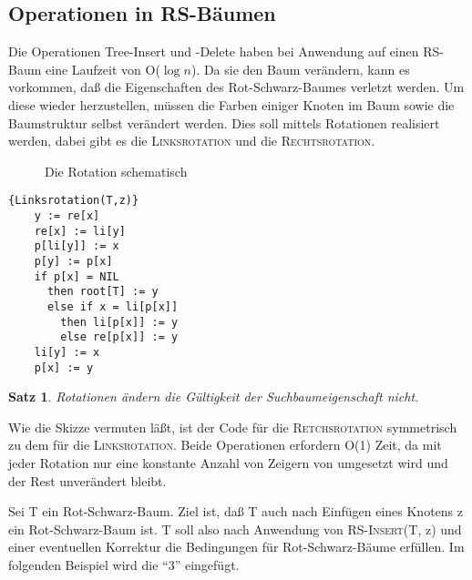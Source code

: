 \documentclass[ngerman,draft,parskip=half*,twoside]{scrreprt}
\theoremstyle{break}
\newtheorem{satz}{Satz}
\begin{document}
\subsection{Operationen in RS-Bäumen}

Die Operationen Tree-Insert und -Delete haben bei Anwendung auf einen RS-Baum eine Laufzeit von O($\log n$). Da
sie den Baum verändern, kann es vorkommen, daß die Eigenschaften des Rot-Schwarz-Baumes verletzt werden. Um diese wieder herzustellen,
müssen die
Farben einiger Knoten im Baum sowie die Baumstruktur selbst verändert werden. Dies soll mittels Rotationen realisiert werden, dabei
gibt es die \textsc{Linksrotation} und die \textsc{Rechtsrotation}.

\centering
\begin{figure}[H]

\caption{Die Rotation schematisch}
\end{figure}


\begin{Algorithmus}[H]
\begin{lstlisting}[frame=tlrb, mathescape=true, title=\textsc{Linksrotation\textnormal{(T, z)}}, gobble=4]{Linksrotation(T,z)}
    y := re[x]
    re[x] := li[y]
    p[li[y]] := x
    p[y] := p[x]
    if p[x] = NIL
      then root[T] := y
      else if x = li[p[x]]
        then li[p[x]] := y
        else re[p[x]] := y
    li[y] := x
    p[x] := y
\end{lstlisting}
\end{Algorithmus}

\begin{satz}
Rotationen ändern die Gültigkeit der Suchbaumeigenschaft nicht.
\end{satz}

Wie die Skizze vermuten läßt, ist der Code für die \textsc{Retchsrotation} symmetrisch zu dem für die \textsc{Linksrotation}. Beide
Operationen erfordern O(1) Zeit, da mit jeder Rotation nur eine konstante Anzahl von Zeigern von umgesetzt wird und der Rest
unverändert bleibt.

Sei T ein Rot-Schwarz-Baum. Ziel ist, daß T auch nach Einfügen eines Knotens z ein Rot-Schwarz-Baum ist. T soll also 
nach Anwendung von \textsc{RS-Insert}(T, z) und einer eventuellen Korrektur die Bedingungen für Rot-Schwarz-Bäume erfüllen. Im folgenden Beispiel wird die "`3"'
eingefügt.
\end{document}
